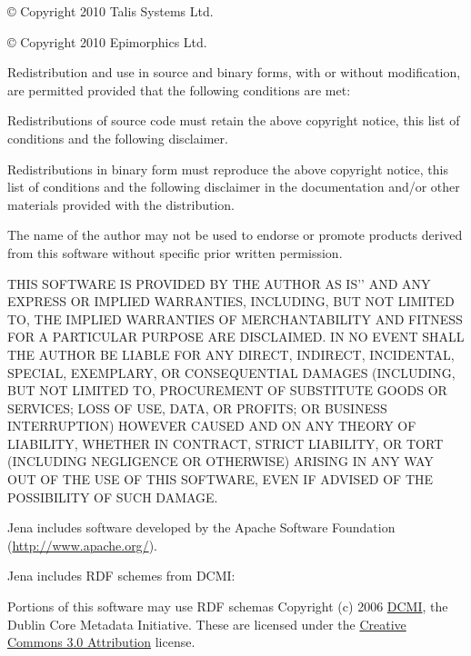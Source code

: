 \documentclass[12pt]{article}
\begin{document}
{{\mdseries\upshape\color{black}
© Copyright 2010 Talis Systems Ltd.}

{\mdseries\upshape\color{black}
© Copyright 2010 Epimorphics Ltd.}

{\mdseries\upshape\color{black}
Redistribution and use in source and binary forms, with or without modification, are permitted provided that the following conditions are met:}

{\mdseries\upshape\color{black}
Redistributions of source code must retain the above copyright notice, this list of conditions and the following disclaimer.}

{\mdseries\upshape\color{black}
Redistributions in binary form must reproduce the above copyright notice, this list of conditions and the following disclaimer in the documentation and/or other materials provided with the distribution.}

{\mdseries\upshape\color{black}
The name of the author may not be used to endorse or promote products derived from this software without specific prior written permission.}

{\mdseries\upshape\color{black}
THIS SOFTWARE IS PROVIDED BY THE AUTHOR {\textasciigrave}{\textasciigrave}AS IS'{}' AND ANY EXPRESS OR IMPLIED WARRANTIES, INCLUDING, BUT NOT LIMITED TO, THE IMPLIED WARRANTIES OF MERCHANTABILITY AND FITNESS FOR A PARTICULAR PURPOSE ARE DISCLAIMED. IN NO EVENT SHALL THE AUTHOR BE LIABLE FOR ANY DIRECT, INDIRECT, INCIDENTAL, SPECIAL, EXEMPLARY, OR CONSEQUENTIAL DAMAGES (INCLUDING, BUT NOT LIMITED TO, PROCUREMENT OF SUBSTITUTE GOODS OR SERVICES; LOSS OF USE, DATA, OR PROFITS; OR BUSINESS INTERRUPTION) HOWEVER CAUSED AND ON ANY THEORY OF LIABILITY, WHETHER IN CONTRACT, STRICT LIABILITY, OR TORT (INCLUDING NEGLIGENCE OR OTHERWISE) ARISING IN ANY WAY OUT OF THE USE OF THIS SOFTWARE, EVEN IF ADVISED OF THE POSSIBILITY OF SUCH DAMAGE.}

{\mdseries\upshape\color{black}
Jena includes software developed by the Apache Software Foundation (\url{http://www.apache.org/}).}

{\mdseries\upshape\color{black}
Jena includes RDF schemes from DCMI:}

{\mdseries\upshape\color{black}
Portions of this software may use RDF schemas Copyright (c) 2006 \href{http://dublincore.org/}{\textcolor[rgb]{0.0,0.0,0.6}{DCMI}}, the Dublin Core Metadata Initiative. These are licensed under the \href{http://creativecommons.org/licenses/by/3.0/}{\textcolor[rgb]{0.0,0.0,0.6}{Creative Commons 3.0 Attribution}} license.}

}
\end{document}
